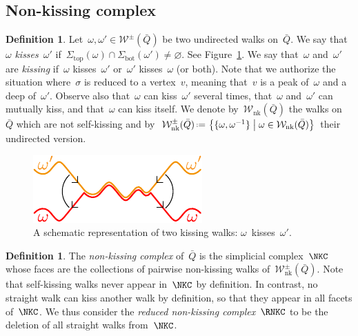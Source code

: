 \documentclass{amsart}
\theoremstyle{definition}
\newtheorem{definition}[theorem]{Definition}
\newcommand{\set}[2]{\left\{ #1 \;\middle|\; #2 \right\}} %
\newcommand{\eqdef}{\mbox{\,\raisebox{0.2ex}{\scriptsize\ensuremath{\mathrm:}}\ensuremath{=}\,}} %
\newcommand{\fref}[1]{Figure~\ref{#1}} %
\newcommand{\ie}{\textit{i.e.}~} %
\newcommand{\darkblue}{\color{darkblue}} %
\newcommand{\defn}[1]{\textsl{\darkblue #1}} %
\newcommand{\strings}{\mathcal{S}} %
\newcommand{\walks}{\mathcal{W}} %
\newcommand{\NKWalks}{\mathcal{W}_\mathrm{nk}} %
\renewcommand{\top}{\mathrm{top}} %
\newcommand{\bottom}{\mathrm{bot}} %
\begin{document}
\subsection{Non-kissing complex}

\begin{definition}
\label{def:kiss}
Let~$\omega,\omega' \in \walks^\pm(\bar Q)$ be two undirected walks on~$\bar Q$.
We say that~$\omega$ \defn{kisses}~$\omega'$ if~$\Sigma_\top(\omega) \cap \Sigma_\bottom(\omega') \ne \varnothing$.
See \fref{fig:kissing}.
We say that~$\omega$ and~$\omega'$ are \defn{kissing} if~$\omega$ kisses~$\omega'$ or~$\omega'$ kisses~$\omega$ (or both).
Note that we authorize the situation where~$\sigma$ is reduced to a vertex~$v$, meaning that~$v$ is a peak of~$\omega$ and a deep of~$\omega'$.
Observe also that~$\omega$ can kiss~$\omega'$ several times, that~$\omega$ and~$\omega'$ can mutually kiss, and that~$\omega$ can kiss itself.
We denote by~$\NKWalks(\bar Q)$ the walks on~$\bar Q$ which are not self-kissing and by~$\NKWalks^\pm(\bar Q) \eqdef \set{\{\omega, \omega^{-1}\}}{\omega \in \NKWalks(\bar Q)}$ their undirected version.
\end{definition}

\begin{figure}
	\capstart
	\centerline{\includegraphics[scale=1]{kissing}}
	\caption{A schematic representation of two kissing walks: $\omega$~kisses~$\omega'$.}
	\label{fig:kissing}
\end{figure}

\begin{definition}
\label{def:nKc}
The \defn{non-kissing complex} of~$\bar Q$ is the simplicial complex~$\NKC$ whose faces are the collections of pairwise non-kissing walks of~$\NKWalks^\pm(\bar Q)$.
Note that self-kissing walks never appear in~$\NKC$ by definition.
In contrast, no straight walk can kiss another walk by definition, so that they appear in all facets of~$\NKC$.
We thus consider the \defn{reduced non-kissing complex}~$\RNKC$ to be the deletion of all straight walks from~$\NKC$.
\end{definition}
\end{document}
